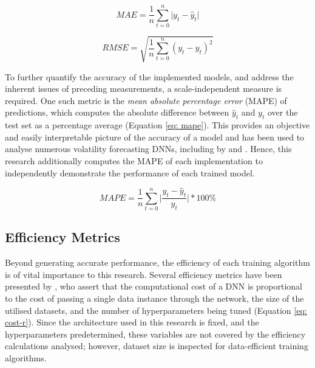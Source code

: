 \documentclass[a4paper, 11pt]{report}
\begin{document}
    \begin{equation}
        \label{eq: mae}
        MAE = \frac{1}{n} \sum_{t=0}^n \lvert y_t - \hat{y}_t \lvert
    \end{equation}
    
    \begin{equation}
        \label{eq: rmse}
        RMSE = \sqrt{\frac{1}{n} \sum_{t=0}^n (y_t - \hat{y}_t)^2}
    \end{equation}


    To further quantify the accuracy of the implemented models, and address the inherent issues of preceding measurements, a scale-independent measure is required. One such metric is the \emph{mean absolute percentage error }(MAPE) of predictions, which computes the absolute difference between $\hat{y}_t$ and $y_t$ over the test set as a percentage average (Equation \ref{eq: mape}). This provides an objective and easily interpretable picture of the accuracy of a model and has been used to analyse numerous volatility forecasting DNNs, including by \citet{xiong-2016} and \citet{zhang-2022}. Hence, this research additionally computes the MAPE of each implementation to independently demonstrate the performance of each trained model.


    \begin{equation}
        \label{eq: mape}
        MAPE = \frac{1}{n} \sum_{t=0}^n \bigg\lvert \frac{y_t - \hat{y}_t}{y_t} \bigg\lvert * 100\%
    \end{equation}


    \subsection{Efficiency Metrics}
    \label{section: efficiency-metrics}

    Beyond generating accurate performance, the efficiency of each training algorithm is of vital importance to this research. Several efficiency metrics have been presented by \citet{schwartz-2019}, who assert that the computational cost of a DNN is proportional to the cost of passing a single data instance through the network, the size of the utilised datasets, and the number of hyperparameters being tuned (Equation \ref{eq: cost-r}). Since the architecture used in this research is fixed, and the hyperparameters predetermined, these variables are not covered by the efficiency calculations analysed; however, dataset size is inspected for data-efficient training algorithms.
\end{document}
